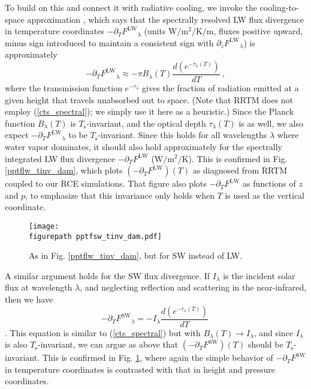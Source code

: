 \documentclass[9pt,twocolumn,twoside,lineno]{pnas-new}
\newcommand{\beqn}{\begin{equation}}
\newcommand{\eeqn}{\end{equation}}
\newcommand{\eqnref}[1]{(\ref{#1})}
\newcommand{\der}[2]{\ensuremath{\frac{d #1}{d #2}}}
\newcommand{\ppz}{\ensuremath{\partial_z}}
\newcommand{\ppt}{\ensuremath{\partial_T}}
\newcommand{\FLW}{\ensuremath{F^\mathrm{LW}}}
\newcommand{\FSW}{\ensuremath{F^\mathrm{SW}}}
\newcommand{\tauk}{\ensuremath{\tau_\lambda}}
\newcommand{\Wmsq}{\ensuremath{\mathrm{W/m^2}}}
\newcommand{\meter}{\ensuremath{\mathrm{m}}}
\newcommand{\Ts}{\ensuremath{T_\mathrm{s}}}
\newcommand{\figurepath}{../../figures/}
\begin{document}
	To build on this and connect it with radiative cooling, we invoke the cooling-to-space  approximation \cite[][]{thomas2002, rodgers1966}, which says that the spectrally resolved LW flux divergence in temperature coordinates $-\ppt \FLW_\lambda$ (units $\Wmsq/\mathrm{K}/\meter$, fluxes positive upward, minus sign introduced to maintain a consistent sign with  $\ppz \FLW_\lambda$) is approximately
	\beqn
		-\ppt \FLW_\lambda \approx - \pi B_\lambda(T) \frac{d (e^{-\tauk(T)})}{dT} \ ,
	\label{cts_spectral}
	\eeqn
where  the transmission function $e^{-\tauk}$ gives the fraction of radiation emitted at a given height that travels unabsorbed out to space. (Note that RRTM does not employ \eqnref{cts_spectral}; we simply use it here as a heuristic.) Since the Planck function $B_\lambda(T)$ is \Ts-invariant, and the optical depth $\tauk(T)$ is as well, we also expect $-\ppt \FLW_\lambda$ to be \Ts-invariant. Since this holds for all wavelengths $\lambda$ where water vapor dominates, it should also hold approximately for the spectrally integrated LW flux divergence $-\ppt \FLW$ ($\Wmsq/\mathrm{K}$). This is confirmed in  Fig.  \ref{pptflw_tinv_dam}, which plots $(-\ppt \FLW)(T)$ as diagnosed from RRTM coupled to our  RCE simulations.  That figure also plots $-\ppt \FLW$ as functions of $z$ and $p$, to emphasize that this invariance only holds  when $T$ is used as the vertical coordinate.
\begin{figure}[t]
	\begin{center}
			\texttt{[image: \\figurepath pptfsw\_tinv\_dam.pdf]}
		\caption{As in Fig. \ref{pptflw_tinv_dam}, but for SW instead of LW.
		\label{pptfsw_tinv_dam}
		}
	\end{center}
\end{figure}


	A similar argument holds for the SW flux divergence. If $I_\lambda$ is the incident solar flux at wavelength $\lambda$, and  neglecting reflection and scattering in the  near-infrared, 
then  we have
	\beqn
		-\ppt \FSW_\lambda = - I_\lambda \der{(e^{-\tauk(T)})}{T}
		\
	\eeqn
\cite[][eqn. 9.26]{thomas2002}. This equation is similar to  \eqnref{cts_spectral} but with $B_\lambda(T) \rightarrow I_\lambda$, and since $I_\lambda$ is also \Ts-invariant, we can argue as above that $(-\ppt \FSW)(T)$ should be \Ts-invariant. This is confirmed in Fig. \ref{pptfsw_tinv_dam}, where again the simple behavior of $-\ppt \FSW$ in temperature coordinates is contrasted with that in height and pressure coordinates.
\end{document}
